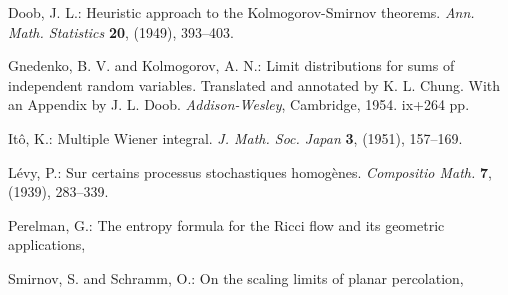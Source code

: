 \documentclass[ECP]{ejpecp} %
\begin{document}
\begin{thebibliography}{99}

 Doob, J. L.: Heuristic approach to the Kolmogorov-Smirnov
  theorems. \emph{Ann. Math. Statistics} \textbf{20}, (1949), 393--403.

 Gnedenko, B. V. and Kolmogorov, A. N.: Limit distributions for
  sums of independent random variables. Translated and annotated by K. L.
  Chung. With an Appendix by J. L. Doob. \emph{Addison-Wesley}, Cambridge,
  1954. ix+264 pp. 

 It\^o, K.: Multiple Wiener integral. \emph{J. Math. Soc. Japan}
  \textbf{3}, (1951), 157--169. 

 L\'evy, P.: Sur certains processus stochastiques homog\`enes.
  \emph{Compositio Math.} \textbf{7}, (1939), 283--339. 

 Perelman, G.: The entropy formula for the Ricci flow and its
  geometric applications, 

 Smirnov, S. and Schramm, O.: On the scaling limits of planar
  percolation, 

\end{thebibliography}



 
\end{document}
